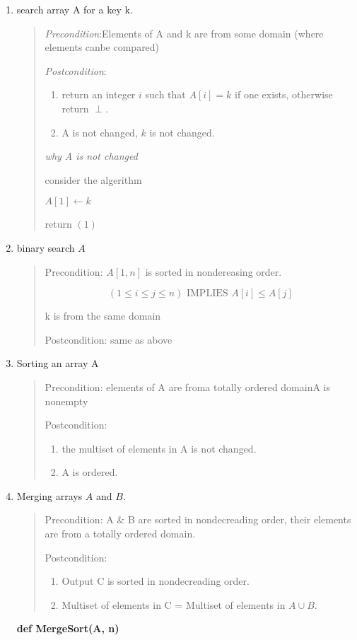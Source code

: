 \documentclass[
]{article}
\newcommand{\Implies}{\mbox{ IMPLIES }}
\begin{document}
\begin{enumerate}
\def\labelenumi{\arabic{enumi}.}
\item
  search array A for a key k.

  \begin{quote}
  \emph{Precondition}:Elements of A and k are from some domain (where
  elements canbe compared)

  \emph{Postcondition}:

  \begin{enumerate}
  \def\labelenumii{\arabic{enumii}.}
  \item
    return an integer \(i\) such that \(A[i] =k\) if one exists,
    otherwise return \(\perp\).
  \item
    A is not changed, \(k\) is not changed.
  \end{enumerate}

  \emph{why A is not changed}

  consider the algerithm

  \(A[1] \leftarrow k \)

  return \((1)\)
  \end{quote}
\item
  binary search \(A\)

  \begin{quote}
  Precondition: \(A[1,n]\) is sorted in nondereasing order.

  \[(1\leq i\leq j\leq n)\Implies A[i]\leq A[j]\]

  k is from the same domain

  Postcondition: same as above
  \end{quote}
\item
  Sorting an array A

  \begin{quote}
  Precondition: elements of A are froma totally ordered domainA is
  nonempty

  Postcondition:

  \begin{enumerate}
  \def\labelenumii{\arabic{enumii}.}
  \item
    the multiset of elements in A is not changed.
  \item
    A is ordered.
  \end{enumerate}
  \end{quote}
\item
  Merging arrays \(A\) and \(B\).

  \begin{quote}
  Precondition: A \& B are sorted in nondecreading order, their elements
  are from a totally ordered domain.

  Postcondition:

  \begin{enumerate}
  \def\labelenumii{\arabic{enumii}.}
  \item
    Output C is sorted in nondecreading order.
  \item
    Multiset of elements in C = Multiset of elements in \(A\cup B\).
  \end{enumerate}
  \end{quote}

  \textbf{def MergeSort(A, n)}
\end{enumerate}
\end{document}
